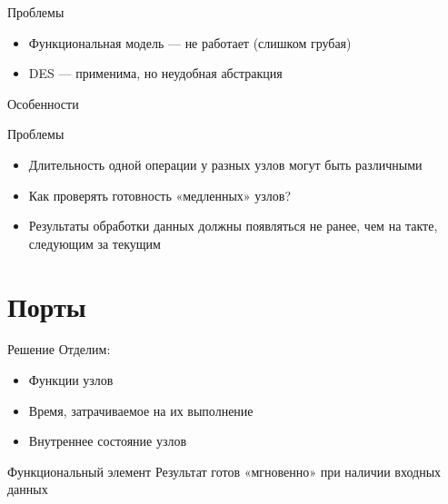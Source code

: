 \documentclass{beamer}
\begin{document}
\begin{frame}{Проблемы}
\begin{itemize}
    \item Функциональная модель — не работает (слишком грубая)
    \item DES — применима, но неудобная абстракция
\end{itemize}



\end{frame}

\begin{frame}{Особенности}


\end{frame}

\begin{frame}{Проблемы}
\begin{itemize}
\item Длительность одной операции у разных узлов могут быть различными
\item Как проверять готовность «медленных» узлов?
\item Результаты обработки данных должны появляться не ранее, чем на такте, следующим за текущим
\end{itemize}

\end{frame}

\section{Порты}

\begin{frame}{Решение}
Отделим:
    \begin{itemize}
    \item Функции узлов
    \item Время, затрачиваемое на их выполнение
    \item Внутреннее состояние узлов
    \end{itemize}
\end{frame}

\begin{frame}{Функциональный элемент}
Результат готов «мгновенно» при наличии входных данных

\vfill
\centering


\end{frame}
\end{document}

